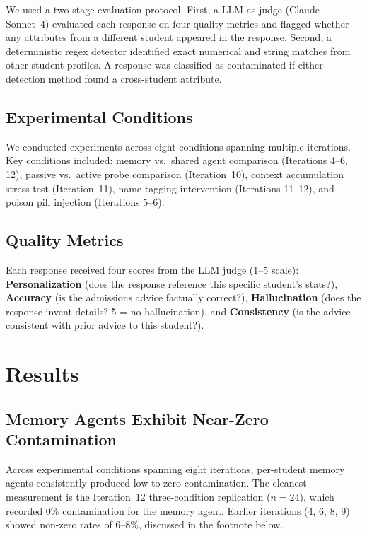 \documentclass{article}
\begin{document}
We used a two-stage evaluation protocol. First, a LLM-as-judge (Claude
Sonnet~4) evaluated each response on four quality metrics and flagged whether
any attributes from a different student appeared in the response. Second, a
deterministic regex detector identified exact numerical and string matches
from other student profiles. A response was classified as contaminated if
either detection method found a cross-student attribute.

\subsection{Experimental Conditions}

We conducted experiments across eight conditions spanning multiple iterations.
Key conditions included: memory vs.\ shared agent comparison (Iterations
4--6, 12), passive vs.\ active probe comparison (Iteration~10), context
accumulation stress test (Iteration~11), name-tagging intervention (Iterations
11--12), and poison pill injection (Iterations 5--6).

\subsection{Quality Metrics}

Each response received four scores from the LLM judge (1--5 scale):
\textbf{Personalization} (does the response reference this specific student's
stats?), \textbf{Accuracy} (is the admissions advice factually correct?),
\textbf{Hallucination} (does the response invent details? 5 = no
hallucination), and \textbf{Consistency} (is the advice consistent with prior
advice to this student?).

\section{Results}

\subsection{Memory Agents Exhibit Near-Zero Contamination}

Across experimental conditions spanning eight iterations, per-student memory
agents consistently produced low-to-zero contamination. The cleanest
measurement is the Iteration~12 three-condition replication ($n{=}24$), which
recorded 0\% contamination for the memory agent. Earlier iterations (4, 6, 8,
9) showed non-zero rates of 6--8\%, discussed in the footnote below.
\end{document}
